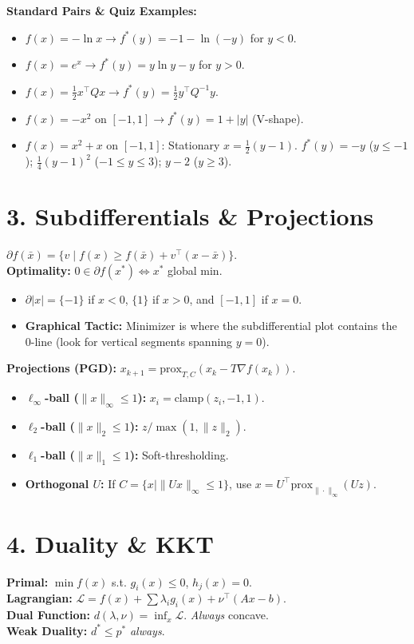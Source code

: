 \textbf{Standard Pairs \& Quiz Examples:}
\begin{itemize}[leftmargin=*]
  \item $f(x) = -\ln x \to f^*(y) = -1-\ln(-y)$ for $y<0$.
  \item $f(x) = e^x \to f^*(y) = y \ln y - y$ for $y>0$.
  \item $f(x) = \frac{1}{2}x^\top Q x \to f^*(y) = \frac{1}{2}y^\top Q^{-1} y$.
  \item $f(x) = -x^2$ on $[-1,1] \to f^*(y) = 1+|y|$ (V-shape).
  \item $f(x) = x^2+x$ on $[-1,1]$: Stationary $x=\frac{1}{2}(y-1)$.
    $f^*(y) = -y$ ($y\le-1$); $\frac{1}{4}(y-1)^2$ ($-1\le y\le3$);
    $y-2$ ($y\ge3$).
\end{itemize}

\section*{3. Subdifferentials \& Projections}
$\partial f(\bar x)=\{v\mid f(x)\ge f(\bar x)+v^\top(x-\bar x)\}$. \\
\textbf{Optimality:} $0 \in \partial f(x^*) \iff x^*$ global min.
\begin{itemize}[leftmargin=*]
  \item $\partial |x| = \{-1\}$ if $x<0$, $\{1\}$ if $x>0$, and $[-1,
    1]$ if $x=0$.
  \item \textbf{Graphical Tactic:} Minimizer is where the
    subdifferential plot contains the 0-line (look for vertical
    segments spanning $y=0$).
\end{itemize}

\textbf{Projections (PGD):} $x_{k+1} = \text{prox}_{T, C}(x_k - T
\nabla f(x_k))$.
\begin{itemize}[leftmargin=*]
  \item \textbf{$\ell_\infty$-ball ($\|x\|_\infty \le 1$):} $x_i =
    \text{clamp}(z_i, -1, 1)$.
  \item \textbf{$\ell_2$-ball ($\|x\|_2 \le 1$):} $z / \max(1, \|z\|_2)$.
  \item \textbf{$\ell_1$-ball ($\|x\|_1 \le 1$):} Soft-thresholding.
  \item \textbf{Orthogonal $U$:} If $C = \{x \mid \|Ux\|_\infty \le
    1\}$, use $x = U^\top \text{prox}_{\|\cdot\|_\infty}(Uz)$.
\end{itemize}

\section*{4. Duality \& KKT}
\textbf{Primal:} $\min f(x)$ s.t. $g_i(x)\le0$, $h_j(x)=0$. \\
\textbf{Lagrangian:} $\mathcal{L} = f(x) + \sum \lambda_i g_i(x) +
\nu^\top(Ax-b)$. \\
\textbf{Dual Function:} $d(\lambda, \nu) = \inf_x \mathcal{L}$.
\textit{Always} concave. \\
\textbf{Weak Duality:} $d^* \le p^*$ \textit{always}.

